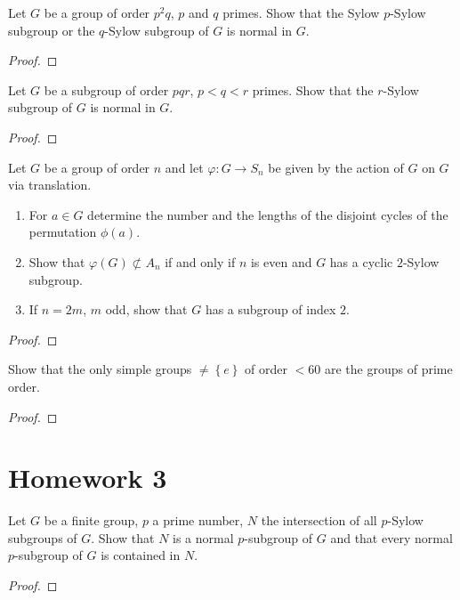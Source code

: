 \begin{problem}
Let $G$ be a group of order $p^2q$, $p$ and $q$ primes. Show that the Sylow
$p$-Sylow subgroup or the $q$-Sylow subgroup of $G$ is normal in $G$.
\end{problem}
\begin{proof}
\end{proof}

\begin{problem}
Let $G$ be a subgroup of order $pqr$, $p<q<r$ primes. Show that the
$r$-Sylow subgroup of $G$ is normal in $G$.
\end{problem}
\begin{proof}
\end{proof}

\begin{problem}
Let $G$ be a group of order $n$ and let $\varphi\colon G\to S_n$ be given by
the action of $G$ on $G$ via translation.
\begin{enumerate}[label=(\alph*)]
\item For $a\in G$ determine the number and the lengths of the disjoint
  cycles of the permutation $\phi(a)$.
\item Show that $\varphi(G)\nsubset A_n$ if and only if $n$ is even and $G$
  has a cyclic $2$-Sylow subgroup.
\item If $n=2m$, $m$ odd, show that $G$ has a subgroup of index $2$.
\end{enumerate}
\end{problem}
\begin{proof}
\end{proof}

\begin{problem}
Show that the only simple groups $\neq\left\{e\right\}$ of order $<60$ are
the groups of prime order.
\end{problem}
\begin{proof}
\end{proof}

\section{Homework 3}
\begin{problem}
Let $G$ be a finite group, $p$ a prime number, $N$ the intersection of all
$p$-Sylow subgroups of $G$. Show that $N$ is a normal $p$-subgroup of $G$
and that every normal $p$-subgroup of $G$ is contained in $N$.
\end{problem}
\begin{proof}
\end{proof}

